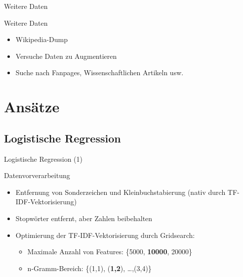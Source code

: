 \documentclass[aspectratio=169]{beamer} %
\begin{document}
\begin{frame}{Weitere Daten}
\begin{block}{Weitere Daten}
 
  
  \begin{itemize}
    \item Wikipedia-Dump
    \item Versuche Daten zu Augmentieren
    \item Suche nach Fanpages, Wissenschaftlichen Artikeln usw.
  \end{itemize}
  \end{block}
\end{frame}


\section{Ans\"atze}

\subsection{Logistische Regression}

\begin{frame}{Logistische Regression (1)}
    \begin{block}{Datenvorverarbeitung}
        \begin{itemize}
            \item Entfernung von Sonderzeichen und Kleinbuchstabierung (nativ durch TF-IDF-Vektorisierung)
            \item Stopw\"orter entfernt, aber Zahlen beibehalten
            \item Optimierung der TF-IDF-Vektorisierung durch Gridsearch:
                  \begin{itemize}
                      \item Maximale Anzahl von Features: \{5000, \textbf{10000}, 20000\}
                      \item n-Gramm-Bereich: \{(1,1), (\textbf{1,2}), \dots ,(3,4)\}
                  \end{itemize}
        \end{itemize}
    \end{block}
\end{frame}
\end{document}
